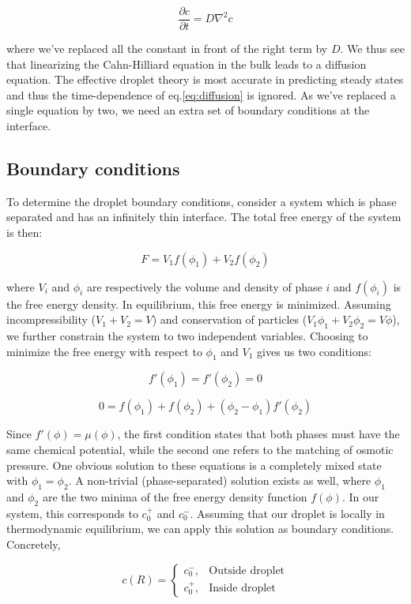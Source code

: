 \documentclass[12pt,a4paper,]{Dissertate}
\begin{document}
\begin{equation}
\frac{\partial c }{\partial t} = D\nabla^2c
\label{eq:diffusion}\end{equation}

where we've replaced all the constant in front of the right term by
\(D\). We thus see that linearizing the Cahn-Hilliard equation in the
bulk leads to a diffusion equation. The effective droplet theory is most
accurate in predicting steady states and thus the time-dependence of
eq.\ref{eq:diffusion} is ignored. As we've replaced a single equation
by two, we need an extra set of boundary conditions at the interface.

\hypertarget{boundary-conditions}{%
\subsection{Boundary conditions}\label{boundary-conditions}}

To determine the droplet boundary conditions, consider a system which is
phase separated and has an infinitely thin interface. The total free
energy of the system is then:

\[
F = V_1 f(\phi_1) + V_2 f(\phi_2)
\]

where \(V_i\) and \(\phi_i\) are respectively the volume and density of
phase \(i\) and \(f(\phi_i)\) is the free energy density. In
equilibrium, this free energy is minimized. Assuming incompressibility
(\(V_1+V_2=V\)) and conservation of particles
(\(V_1\phi_1+V_2\phi_2=V\phi\)), we further constrain the system to two
independent variables. Choosing to minimize the free energy with respect
to \(\phi_1\) and \(V_1\) gives us two conditions:

\[
f'(\phi_1) = f'(\phi_2) = 0
\]

\[
0 = f(\phi_1) + f(\phi_2) + (\phi_2-\phi_1)f'(\phi_2)
\]

Since \(f'(\phi) = \mu(\phi)\), the first condition states that both
phases must have the same chemical potential, while the second one
refers to the matching of osmotic pressure. One obvious solution to
these equations is a completely mixed state with \(\phi_1=\phi_2\). A
non-trivial (phase-separated) solution exists as well, where \(\phi_1\)
and \(\phi_2\) are the two minima of the free energy density function
\(f(\phi)\). In our system, this corresponds to \(c_0^+\) and \(c_0^-\).
Assuming that our droplet is locally in thermodynamic equilibrium, we
can apply this solution as boundary conditions. Concretely,

\[
c(R) = 
\begin{cases}
    c_0^-,& \text{Outside droplet}\\
    c_0^+,& \text{Inside droplet}
\end{cases}
\]
\end{document}
